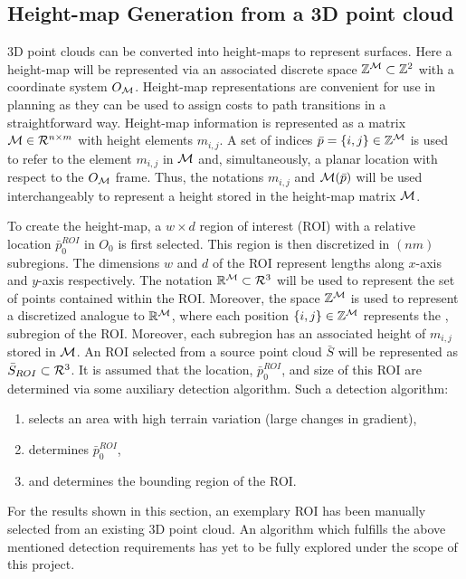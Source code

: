 		\subsection{Height-map Generation from a 3D point cloud}
			
			3D point clouds can be converted into height-maps to represent surfaces. Here a height-map will be represented via an associated discrete space ${\Bbb Z}^{{\cal M}}\subset{\Bbb Z}^{2}$ with a coordinate system $O_{{\cal M}}$. Height-map representations are convenient for use in planning as they can be used to assign costs to path transitions in a straightforward way. Height-map information is represented as a matrix ${\cal M}\in {\cal R}^{n\times m}$ with height elements $m_{i,j}$. A set of indices $\bar{p} = \{i,j\}\in{\Bbb Z}^{{\cal M}}$ is used to refer to the element $m_{i,j}$ in ${\cal M}$ and, simultaneously, a planar location with respect to the $O_{{\cal M}}$ frame. Thus, the notations $m_{i,j}$ and ${\cal M}(\bar{p})$ will be used interchangeably to represent a height stored in the height-map matrix ${\cal M}$.

			To create the height-map, a $w\times d$ region of interest (ROI) with a relative location $\bar{p}_{0}^{ROI}$ in $O_{0}$ is first selected. This region is then discretized in $(nm)$ subregions. The dimensions $w$ and $d$ of the ROI represent lengths along $x$-axis and $y$-axis respectively. The notation ${\Bbb R}^{{\cal M}}\subset {\cal R}^{3}$ will be used to represent the set of points contained within the ROI.  Moreover, the space ${\Bbb Z}^{{\cal M}}$ is used to represent a discretized analogue to ${\Bbb R}^{{\cal M}}$, where each position $\{i,j\}\in{\Bbb Z}^{{\cal M}}$ represents the \Ith, \Jth subregion of the ROI. Moreover, each subregion has an associated height of $m_{i,j}$ stored in ${\cal M}$. An ROI selected from a source point cloud $\bar{S}$ will be represented as $\bar{S}_{ROI}\subset{\cal R}^{3}$. It is assumed that the location, $\bar{p}_{0}^{ROI}$, and size of this ROI are determined via some auxiliary detection algorithm. Such a detection algorithm: 
			\begin{enumerate}
				\item selects an area with high terrain variation (large changes in gradient),
				\item determines $\bar{p}_{0}^{ROI}$,
				\item and determines the bounding region of the ROI.
			\end{enumerate}%
			For the results shown in this section, an exemplary ROI has been manually selected from an existing 3D point cloud. An algorithm which fulfills the above mentioned detection requirements has yet to be fully explored under the scope of this project. %

